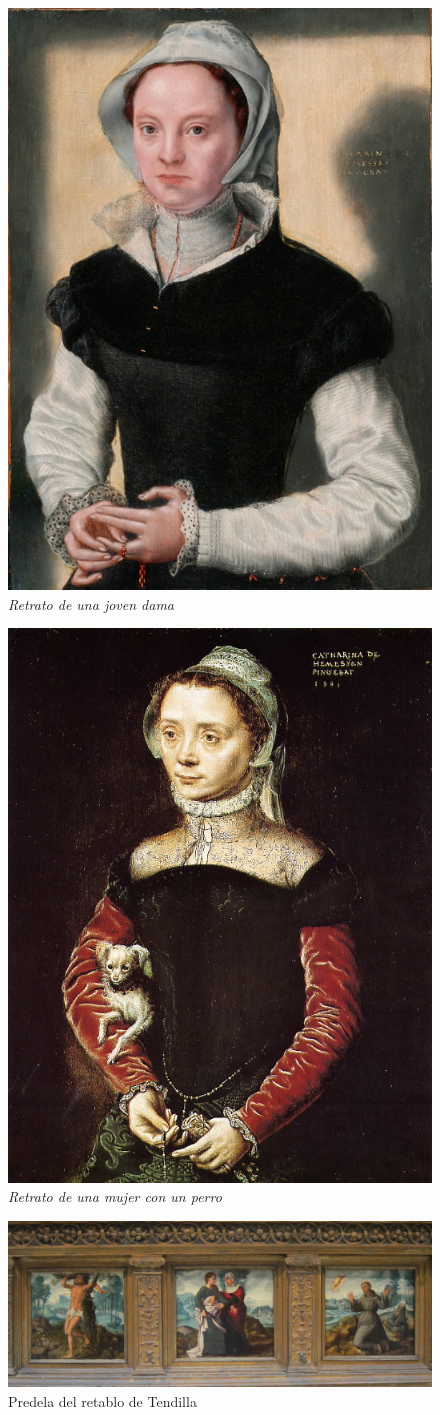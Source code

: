 \documentclass[12pt]{book}
\begin{document}
\begin{figure}[h]
	\centering
	\includegraphics[width=0.4\linewidth]{portrait-of-a-young-lady}
	\caption{\textit{Retrato de una joven dama}}
\end{figure}

\begin{figure}[h]
	\centering
	\includegraphics[width=0.4\linewidth]{portrait-of-a-woman-with-a-dog}
	\caption{\textit{Retrato de una mujer con un perro}}
\end{figure}

\begin{figure}[h]
	\centering
	\includegraphics[width=0.8\linewidth]{predella-tendilla-retablo}
	\caption{Predela del retablo de Tendilla}
\end{figure}
\end{document}
